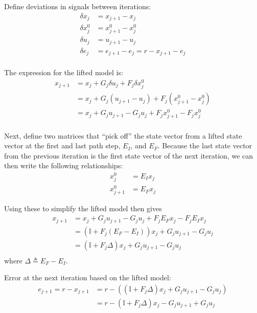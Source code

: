 \documentclass[legalpaper,landscape]{article}
\begin{document}
Define deviations in signals between iterations:
\begin{align}
\delta x_j & = x_{j+1} - x_j\\
\delta x_j^0 & = x_{j+1}^0 - x_j^0\\
\delta u_j & = u_{j+1} - u_j\\
\delta e_j & = e_{j+1} - e_j = r - x_{j+1} - e_j\\
\end{align}

The expression for the lifted model is:
\begin{align}
x_{j+1} & = x_{j} + G_j \delta u_{j}           + F_j \delta x^0_{j}\\
		& = x_{j} + G_j \left(u_{j+1}-u_j\right) + F_j \left(x^0_{j+1}-x^0_j\right)\\
		& = x_{j} + G_j u_{j+1} - G_j u_j        + F_j x^0_{j+1} - F_j x^0_j\\
\end{align}

Next, define two matrices that ``pick off'' the state vector from a lifted state vector at the first and last path step, $E_I$, and $E_F$.  Because the last state vector from the previous iteration is the first state vector of the next iteration, we can then write the following relationships:
\begin{align}
x_{j}^0 & = E_I x_j \\
x_{j+1}^0 & = E_F x_j
\end{align}

Using these to simplify the lifted model then gives
\begin{align}
x_{j+1} & = x_{j} + G_j u_{j+1} - G_j u_j        + F_j E_F x_j - F_j E_I x_j\\
        & = \left(\mathbb{I} +F_j \left(E_F - E_I\right) \right)x_{j} + G_j u_{j+1} - G_j u_j\\
        & = \left(\mathbb{I} +F_j \Delta \right)x_{j} + G_j u_{j+1} - G_j u_j\\
\end{align}
where $\Delta \triangleq E_F-E_I$.


Error at the next iteration based on the lifted model:
\begin{align}
e_{j+1} = r - x_{j+1} & = r - \left(\left(\mathbb{I} +F_j \Delta \right)x_{j} + G_j u_{j+1} - G_j u_j\right)\\
					  & = r - \left(\mathbb{I} +F_j \Delta \right)x_{j} - G_j u_{j+1} + G_j u_j\\
\end{align}
\end{document}
